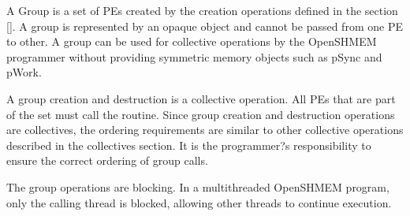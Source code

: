 A Group is a set of \acp{PE} created by the creation operations defined in the section \ref{}. A  group is represented by an opaque object and cannot be passed from one \ac{PE} to other. A group can be used for collective operations by the OpenSHMEM programmer without providing symmetric memory objects such as pSync and pWork. 

A group creation and destruction is a collective operation. All \acp{PE} that are part of the set must call the routine. 
Since group creation and destruction operations are collectives, the ordering requirements are similar to other collective operations described in the collectives section. It is the programmer?s responsibility to ensure the correct ordering of group calls.

The group operations are blocking. In a multithreaded OpenSHMEM program, only the calling thread is blocked, allowing other threads to continue execution. 
